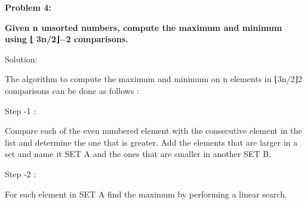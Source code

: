 \documentclass[letterpaper,portrait,12pt]{article}
\begin{document}
\begin{flushleft}
		
\end{flushleft}


\begin{flushleft}
\textbf{Problem 4:}
\end{flushleft}


\begin{flushleft}
\textbf{	}\textbf{Given n unsorted numbers, compute the maximum and minimum using ⌊ 3n/2⌋$-$2 comparisons.}
\end{flushleft}


\begin{flushleft}

\end{flushleft}


\begin{flushleft}
Solution:
\end{flushleft}


\begin{flushleft}

\end{flushleft}


\begin{flushleft}
The algorithm to compute the maximum and minimum on n elements in ⌊3n/2⌋2 comparisons can be done as follows :
\end{flushleft}


\begin{flushleft}

\end{flushleft}


\begin{flushleft}
Step -1 :
\end{flushleft}


\begin{flushleft}
Compare each of the even numbered element with the consecutive element in the list and determine the one that is greater. Add the elements that are larger in a set and name it SET A and the ones that are smaller in another SET B.
\end{flushleft}


\begin{flushleft}

\end{flushleft}


\begin{flushleft}
Step -2 :
\end{flushleft}


\begin{flushleft}
For each element in SET A find the maximum by performing a linear search.
\end{flushleft}
\end{document}
